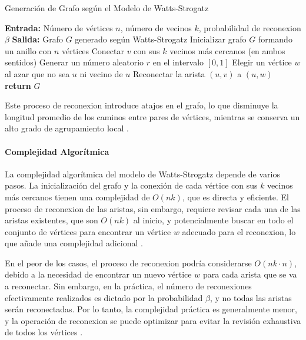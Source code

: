 \begin{algorithm}
\caption{Generación de Grafo según el Modelo de Watts-Strogatz}
\begin{algorithmic}[1]
\State \textbf{Entrada:} Número de vértices $n$, número de vecinos $k$, probabilidad de reconexion $\beta$
\State \textbf{Salida:} Grafo $G$ generado según Watts-Strogatz
    \State Inicializar grafo $G$ formando un anillo con $n$ vértices
        \State Conectar $v$ con sus $k$ vecinos más cercanos (en ambos sentidos)
    \EndFor
        \State Generar un número aleatorio $r$ en el intervalo $[0, 1]$
            \State Elegir un vértice $w$ al azar que no sea $u$ ni vecino de $u$
            \State Reconectar la arista $(u, v)$ a $(u, w)$
        \EndIf
    \EndFor
    \State \textbf{return} $G$
\EndProcedure
\end{algorithmic}
\end{algorithm}

Este proceso de reconexion introduce atajos en el grafo, lo que disminuye la longitud promedio de los caminos entre pares de vértices, mientras se conserva un alto grado de agrupamiento local .

\paragraph{Complejidad Algorítmica}

La complejidad algorítmica del modelo de Watts-Strogatz depende de varios pasos. La inicialización del grafo y la conexión de cada vértice con sus $k$ vecinos más cercanos tienen una complejidad de $O(nk)$, que es directa y eficiente. El proceso de reconexion de las aristas, sin embargo, requiere revisar cada una de las aristas existentes, que son $O(nk)$ al inicio, y potencialmente buscar en todo el conjunto de vértices para encontrar un vértice $w$ adecuado para el reconexion, lo que añade una complejidad adicional .

En el peor de los casos, el proceso de reconexion podría considerarse $O(nk \cdot n)$, debido a la necesidad de encontrar un nuevo vértice $w$ para cada arista que se va a reconectar. Sin embargo, en la práctica, el número de reconexiones efectivamente realizados es dictado por la probabilidad $\beta$, y no todas las aristas serán reconectadas. Por lo tanto, la complejidad práctica es generalmente menor, y la operación de reconexion se puede optimizar para evitar la revisión exhaustiva de todos los vértices .

